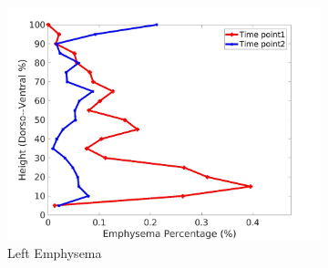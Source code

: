\begin{figure}[H]
\begin{subfigure}{.42\linewidth}
  \includegraphics[width=\linewidth,trim={{.0\wd0} {.0\wd0} {.0\wd0} {.0\wd0}},clip]{Appendix/Image_AppexA/DorsoToVentral/IPF14LeftLungEmphysemaDiseaseDorsoToVentral.jpg} %
  \caption{Left Emphysema}
  \label{fig:IPF14DiseaseDorsoToVentral-g} 
\end{subfigure} 
\begin{subfigure}{.42\linewidth}%

\end{subfigure}
\end{figure}
